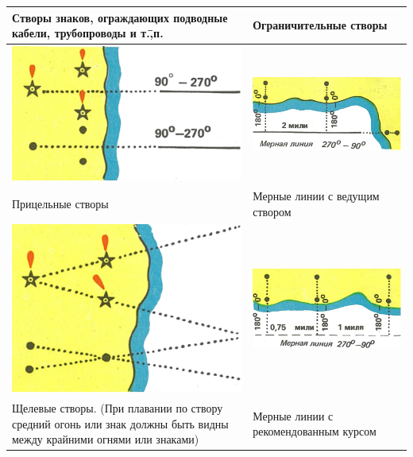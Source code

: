 \documentclass[a4paper, 12pt, twoside, final, book, russian, fittopage, cyremdash]{ncc}
\begin{document}
\begin{longtable}{m{}|m{}}
  Створы знаков, ограждающих  подводные кабели, трубопроводы и т.\=,п. & Ограничительные створы \\
  \midrule
  \includegraphics[scale=1.3]{APP-2-B-30} & \includegraphics[scale=1.3]{APP-2-B-33} \\
  Прицельные створы & Мерные линии с ведущим створом \\
  \midrule
  \includegraphics[scale=1.3]{APP-2-B-31} & \includegraphics[scale=1.3]{APP-2-B-34} \\
  Щелевые створы. (При плавании по створу средний огонь или знак должны быть видны между крайними огнями или знаками) & Мерные линии с рекомендованным курсом \\
  \bottomrule
\end{longtable}
\end{document}
